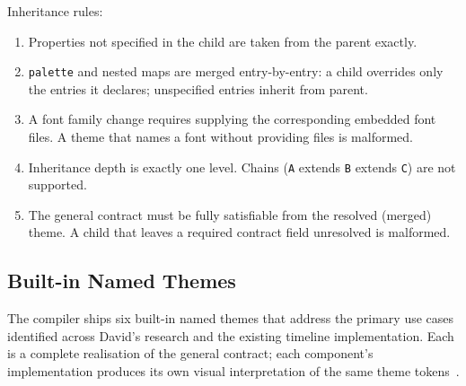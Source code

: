 Inheritance rules:
\begin{enumerate}
  \item Properties not specified in the child are taken from the parent exactly.
  \item \texttt{palette} and nested maps are merged entry-by-entry: a child overrides
        only the entries it declares; unspecified entries inherit from parent.
  \item A font family change requires supplying the corresponding embedded font files.
        A theme that names a font without providing files is malformed.
  \item Inheritance depth is exactly one level. Chains
        (\texttt{A} extends \texttt{B} extends \texttt{C}) are not supported.
  \item The general contract must be fully satisfiable from the resolved (merged) theme.
        A child that leaves a required contract field unresolved is malformed.
\end{enumerate}

\subsection{Built-in Named Themes}
\label{sec:builtin-themes}

The compiler ships six built-in named themes that address the primary use cases identified
across David's research and the existing timeline implementation. Each is a complete
realisation of the general contract; each component's implementation produces its own
visual interpretation of the same theme tokens~\cite{thinkcell,mermaid2023}.

